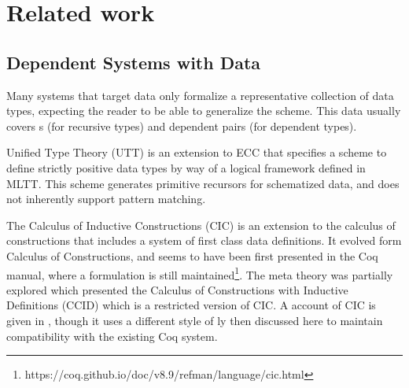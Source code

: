 




\section{Related work}

\subsection{Dependent Systems with Data}

Many systems that target data only formalize a representative collection of data types, expecting the reader to be able to generalize the scheme.
This data usually covers \Nat{}s (for recursive types) and dependent pairs (for dependent types). %



Unified Type Theory (\ac{UTT})\cite{luo1990extended,luo1994computation} is an extension to \ac{ECC} that specifies a scheme to define strictly positive data types by way of a logical framework defined in \ac{MLTT}.
This scheme generates primitive recursors for schematized data, and does not inherently support pattern matching.

The Calculus of Inductive Constructions (\ac{CIC}) is an extension to the calculus of constructions that includes a system of first class data definitions.
It evolved form Calculus of Constructions, and seems to have been first presented in the Coq manual, where a formulation is still maintained\footnote{https://coq.github.io/doc/v8.9/refman/language/cic.html}.
The meta theory was partially explored \cite{10.1007/BFb0037116} which presented the  Calculus of Constructions with Inductive Definitions (CCID) which is a restricted version of \ac{CIC}.
A \bidir{} account of \ac{CIC} is given in \cite{lennonbertrand:LIPIcs.ITP.2021.24}, though it uses a different style of \bidir{}ly then discussed here to maintain compatibility with the existing Coq system.

